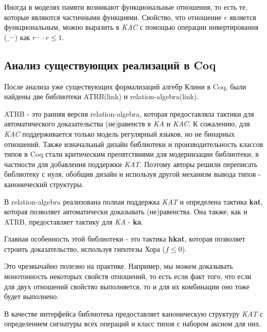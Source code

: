 \documentclass[times
              ]{itmo-student-thesis}
\begin{document}
    Иногда в моделях памяти возникают функциональные отношения, то есть те, которые являются частичными функциями. Свойство, что отношение $ r $ является функциональным, можно выразить в \textit{KAC} с помощью операции инвертирования ($ \_^{\smile} $) как $ r^{\smile} \cdot r \leq 1 $.


  \subsection{Анализ существующих реализаций в Coq}

    После анализа уже существующих формализаций алгебр Клини в Coq, были найдены две библиотеки ATRB(link) и relation-algebra(link).

    ATRB - это ранняя версия relation-algebra, которая предоставляла тактики для автоматического доказательства (не)равенств в \textit{KA} и \textit{KAC}.
    К сожалению, для \textit{KAC} поддерживается только модель регулярный языков, но не бинарных отношений.
    Также изначальный дизайн библиотеки и производительность классов типов в Coq стали критическим препятствиями для модернизации библиотеки,
    в частности для добавления поддержки \textit{KAT}.
    Поэтому авторы решили переписать библиотеку с нуля, обобщив дизайн и используя другой механизм вывода типов - канонический структуры.

    В relation-algebra реализована полная поддержка \textit{KAT} и определена тактика \textbf{kat}, которая позволяет автоматически доказывать (не)равенства.
    Она также, как и ATRB, предоставляет тактику для \textit{KA} - \textbf{ka}.

    Главная особенность этой библиотеки - это тактика \textbf{hkat}, которая позволяет строить доказательство, используя гипотезы Хора ($ f \leq 0 $).

    Это чрезвычайно полезно на практике.
    Например, мы можем доказывать монотонность некоторых свойств отношений,
    то есть если факт того, что если для двух отношений свойство выполняется, то и для их комбинации оно тоже будет выполнено.

    В качестве интерфейса библиотека предоставляет каноническую структуру \textit{KAT} с определением сигнатуры всех операций и класс типов с набором аксиом для них.
\finishrelatedwork
\end{document}
